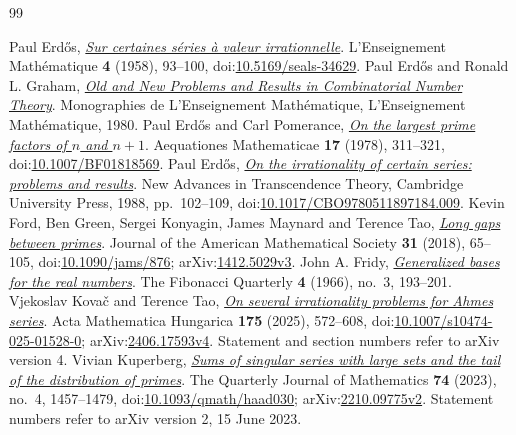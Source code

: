 \documentclass[11pt]{article}
\begin{document}
\begin{thebibliography}{99}
\small\raggedright\setlength{\itemsep}{0pt}
 Paul Erd\H{o}s, \href{https://users.renyi.hu/~p_erdos/1958-19.pdf}{\emph{Sur certaines s\'eries \`a valeur irrationnelle}}.
  L'Enseignement Mathématique \textbf{4} (1958), 93--100, doi:\href{https://doi.org/10.5169/seals-34629}{10.5169/seals-34629}.
 Paul Erd\H{o}s and Ronald L. Graham, \href{https://mathweb.ucsd.edu/~ronspubs/80_11_number_theory.pdf}{\emph{Old and New Problems and Results in Combinatorial Number Theory}}.
  Monographies de L'Enseignement Mathématique, L'Enseignement Mathématique, 1980.
 Paul Erd\H{o}s and Carl Pomerance, \href{https://doi.org/10.1007/BF01818569}{\emph{On the largest prime factors of $n$ and $n+1$}}.
  Aequationes Mathematicae \textbf{17} (1978), 311--321, doi:\href{https://doi.org/10.1007/BF01818569}{10.1007/BF01818569}.
 Paul Erd\H{o}s, \href{https://doi.org/10.1017/CBO9780511897184.009}{\emph{On the irrationality of certain series: problems and results}}.
  New Advances in Transcendence Theory, Cambridge University Press, 1988, pp.~102--109, doi:\href{https://doi.org/10.1017/CBO9780511897184.009}{10.1017/CBO9780511897184.009}.
 Kevin Ford, Ben Green, Sergei Konyagin, James Maynard and Terence Tao, \href{https://arxiv.org/abs/1412.5029v3}{\emph{Long gaps between primes}}.
  Journal of the American Mathematical Society \textbf{31} (2018), 65--105, doi:\href{https://doi.org/10.1090/jams/876}{10.1090/jams/876}; arXiv:\href{https://arxiv.org/abs/1412.5029v3}{1412.5029v3}.
 John A. Fridy, \href{https://www.fq.math.ca/Scanned/4-3/fridy.pdf}{\emph{Generalized bases for the real numbers}}.
  The Fibonacci Quarterly \textbf{4} (1966), no.~3, 193--201.
 Vjekoslav Kova\v{c} and Terence Tao, \href{https://arxiv.org/abs/2406.17593v4}{\emph{On several irrationality problems for Ahmes series}}.
  Acta Mathematica Hungarica \textbf{175} (2025), 572--608, doi:\href{https://doi.org/10.1007/s10474-025-01528-0}{10.1007/s10474-025-01528-0}; arXiv:\href{https://arxiv.org/abs/2406.17593v4}{2406.17593v4}. Statement and section numbers refer to arXiv version 4.
 Vivian Kuperberg, \href{https://arxiv.org/abs/2210.09775v2}{\emph{Sums of singular series with large sets and the tail of the distribution of primes}}.
  The Quarterly Journal of Mathematics \textbf{74} (2023), no.~4, 1457--1479, doi:\href{https://doi.org/10.1093/qmath/haad030}{10.1093/qmath/haad030}; arXiv:\href{https://arxiv.org/abs/2210.09775v2}{2210.09775v2}. Statement numbers refer to arXiv version 2, 15 June 2023.

\end{thebibliography}
\end{document}
